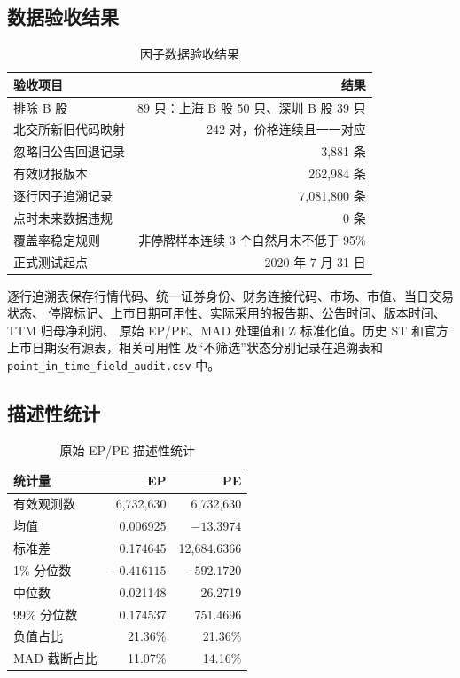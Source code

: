 \documentclass[UTF8,a4paper,11pt]{ctexart}
\begin{document}
\subsection{数据验收结果}

\begin{table}[H]
  \centering
  \caption{因子数据验收结果}
  \begin{tabularx}{0.92\textwidth}{Y R}
    \toprule
    验收项目 & 结果 \\
    \midrule
    排除 B 股 & 89 只：上海 B 股 50 只、深圳 B 股 39 只 \\
    北交所新旧代码映射 & 242 对，价格连续且一一对应 \\
    忽略旧公告回退记录 & 3,881 条 \\
    有效财报版本 & 262,984 条 \\
    逐行因子追溯记录 & 7,081,800 条 \\
    点时未来数据违规 & 0 条 \\
    覆盖率稳定规则 & 非停牌样本连续 3 个自然月末不低于 95\% \\
    正式测试起点 & 2020 年 7 月 31 日 \\
    \bottomrule
  \end{tabularx}
\end{table}

逐行追溯表保存行情代码、统一证券身份、财务连接代码、市场、市值、当日交易状态、
停牌标记、上市日期可用性、实际采用的报告期、公告时间、版本时间、TTM 归母净利润、
原始 EP/PE、MAD 处理值和 Z 标准化值。历史 ST 和官方上市日期没有源表，相关可用性
及“不筛选”状态分别记录在追溯表和 \texttt{point\_in\_time\_field\_audit.csv} 中。

\subsection{描述性统计}

\begin{table}[H]
  \centering
  \caption{原始 EP/PE 描述性统计}
  \label{tab:ep-pe-descriptive}
  \begin{tabular}{lrr}
    \toprule
    统计量 & EP & PE \\
    \midrule
    有效观测数 & 6,732,630 & 6,732,630 \\
    均值 & 0.006925 & $-13.3974$ \\
    标准差 & 0.174645 & 12,684.6366 \\
    1\% 分位数 & $-0.416115$ & $-592.1720$ \\
    中位数 & 0.021148 & 26.2719 \\
    99\% 分位数 & 0.174537 & 751.4696 \\
    负值占比 & 21.36\% & 21.36\% \\
    MAD 截断占比 & 11.07\% & 14.16\% \\
    \bottomrule
  \end{tabular}
\end{table}
\end{document}
